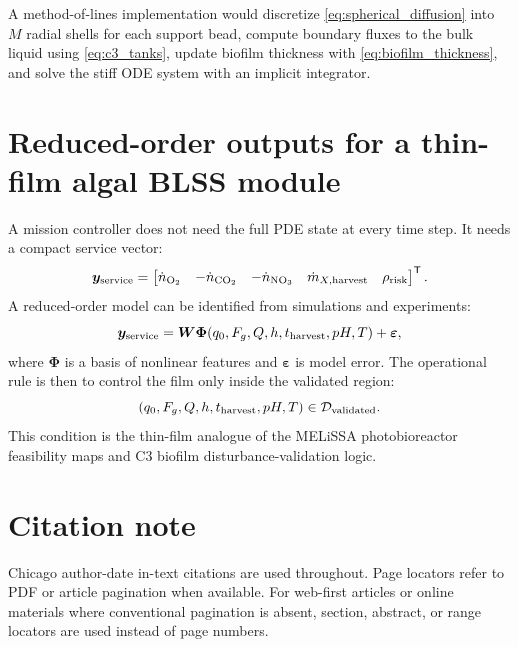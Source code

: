 \documentclass[11pt]{article}
\newcommand{\MEL}{MELiSSA}
\begin{document}
A method-of-lines implementation would discretize \cref{eq:spherical_diffusion} into $M$ radial shells for each support bead, compute boundary fluxes to the bulk liquid using \cref{eq:c3_tanks}, update biofilm thickness with \cref{eq:biofilm_thickness}, and solve the stiff ODE system with an implicit integrator.

\section{Reduced-order outputs for a thin-film algal BLSS module}

A mission controller does not need the full PDE state at every time step. It needs a compact service vector:
\begin{equation}
\bm y_{\rm service}=\begin{bmatrix}
\dot n_{\ce{O2}} & -\dot n_{\ce{CO2}} & -\dot n_{\ce{NO3}} & \dot m_{X,\rm harvest} & \rho_{\rm risk}
\end{bmatrix}^{\mathsf T}.
\end{equation}
A reduced-order model can be identified from simulations and experiments:
\begin{equation}
\bm y_{\rm service}=\bm W\bm \Phi(q_0,F_g,Q,h,t_{\rm harvest},pH,T)+\bm \varepsilon,
\end{equation}
where $\bm \Phi$ is a basis of nonlinear features and $\bm \varepsilon$ is model error. The operational rule is then to control the film only inside the validated region:
\begin{equation}
(q_0,F_g,Q,h,t_{\rm harvest},pH,T)\in \mathcal{D}_{\rm validated}.
\end{equation}
This condition is the thin-film analogue of the \MEL{} photobioreactor feasibility maps and C3 biofilm disturbance-validation logic.

\section{Citation note}

Chicago author-date in-text citations are used throughout. Page locators refer to PDF or article pagination when available. For web-first articles or online materials where conventional pagination is absent, section, abstract, or range locators are used instead of page numbers.

\printbibliography
\end{document}
